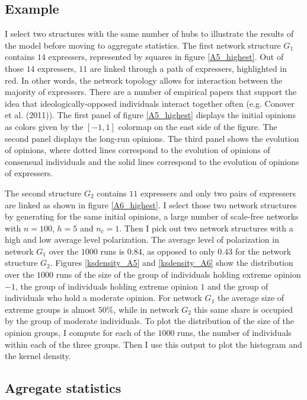 \documentclass{article}
\begin{document}
\subsection{Example}

I select two structures with the same number of hubs to illustrate the results of the model before moving to aggregate statistics.  The first network structure $G_1$ contains $14$ expressers, represented by squares in figure \ref{A5_highest}. Out of those $14$ expressers, $11$ are linked through a path of expressers, highlighted in red. In other words, the network topology allows for interaction between the majority of expressers. There are a number of empirical papers that support the idea that ideologically-opposed individuals interact together often (e.g. Conover et al. (2011)\cite{conover}). The first panel of figure \ref{A5_highest} displays the initial opinions as colors given by the $[-1,1]$ colormap on the east side of the figure. The second panel displays the long-run opinions. The third panel shows the evolution of opinions, where dotted lines correspond to the evolution of opinions of consensual individuals and the solid lines correspond to the evolution of opinions of expressers. 

The second structure $G_2$ contains $11$ expressers and only two pairs of expressers are linked as shown in figure \ref{A6_highest}.   
I select those two network structures by generating for the same initial opinions, a large number of scale-free networks with $n=100$, $h=5$ and $n_c=1$. Then I pick out two network structures with a high and  low average level polarization. The average level of polarization in network $G_1$ over the $1000$ runs is $0.84$, as opposed to only $0.43$ for the network structure $G_2$.  Figures \ref{ksdensity_A5} and \ref{ksdensity_A6} show the distribution over the $1000$ runs of the size of the group of individuals holding extreme opinion $-1$, the group of individuals holding extreme opinion $1$ and the group of individuals who hold a moderate opinion. For network $G_1$ the average size of extreme groups is almost $50\%$, while in network $G_2$ this same share is occupied by the group of moderate individuals. To plot the distribution of the size of the opinion groups, I compute  for each of the $1000$ runs, the number of individuals within each of the three groups. Then I use this output to plot the histogram and the kernel density.

\subsection{Agregate statistics}
\end{document}
